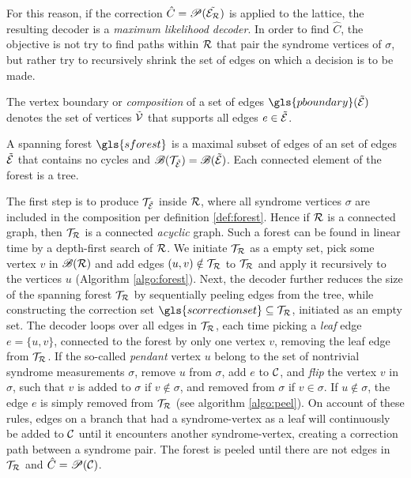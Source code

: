For this reason, if the correction $\hat{C}=\mathscr{P}(\tilde{\mathcal{E}_{\mathcal{R}}})$ is applied to the lattice, the resulting decoder is a \emph{maximum likelihood decoder}. In order to find $\hat{C}$, the objective is not try to find paths within $\mathcal{R}$ that pair the syndrome vertices of $\sigma$, but rather try to recursively shrink the set of edges on which a decision is to be made.
\begin{definition}\label{def:boundaryofedges}
  The vertex boundary or \emph{composition} of a set of edges $\gls{pboundary}(\tilde{\m{E}})$ denotes the set of vertices $\tilde{\mathcal{V}}$ that supports all edges $e\in \tilde{\mathcal{E}}$.
\end{definition}
\begin{definition}\label{def:forest}
  A spanning forest $\gls{sforest}$ is a maximal subset of edges of an set of edges $\tilde{\mathcal{E}}$ that contains no cycles and $\mathscr{B}(\mathcal{T}_{\tilde{\mathcal{E}}}) = \mathscr{B}(\tilde{\mathcal{E}})$. Each connected element of the forest is a tree. 
\end{definition}
The first step  is to produce $\mathcal{T}_{\tilde{\mathcal{E}}}$ inside $\mathcal{R}$, where all syndrome vertices $\sigma$ are included in the composition per definition \ref{def:forest}. Hence if $\mathcal{R}$ is a connected graph, then $\mathcal{T}_{\mathcal{R}}$ is a connected \emph{acyclic} graph. Such a forest can be found in linear time by a depth-first search of $\mathcal{R}$. We initiate $\mathcal{T}_{\mathcal{R}}$ as a empty set, pick some vertex $v$ in $\mathscr{B}(\mathcal{R})$ and add edges $(u,v)\notin \mathcal{T}_{\mathcal{R}}$ to $\mathcal{T}_{\mathcal{R}}$ and apply it recursively to the vertices $u$ (Algorithm \ref{algo:forest}). Next, the decoder further reduces the size of the spanning forest $\mathcal{T}_{\mathcal{R}}$ by sequentially peeling edges from the tree, while constructing the correction set $\gls{scorrectionset}\subseteq \m{T}_\m{R}$, initiated as an empty set. The decoder loops over all edges in $\mathcal{T}_{\mathcal{R}}$, each time picking a \emph{leaf} edge $e = \{u,v\}$, connected to the forest by only one vertex $v$, removing the leaf edge from $\mathcal{T}_{\mathcal{R}}$. If the so-called \emph{pendant} vertex $u$ belong to the set of nontrivial syndrome measurements $\sigma$, remove $u$ from $\sigma$, add $e$ to $\mathcal{C}$, and \emph{flip} the vertex $v$ in $\sigma$, such that $v$ is added to $\sigma$ if $v \notin \sigma$, and removed from $\sigma$ if $v\in\sigma$.  If $u\notin\sigma$, the edge $e$ is simply removed from $\mathcal{T}_{\mathcal{R}}$ (see algorithm \ref{algo:peel}). On account of these rules, edges on a branch that had a syndrome-vertex as a leaf will continuously be added to $\mathcal{C}$ until it encounters another syndrome-vertex, creating a correction path between a syndrome pair. The forest is peeled until there are not edges in $\mathcal{T}_{\mathcal{R}}$ and $\hat{C}=\mathscr{P}(\mathcal{C})$.

